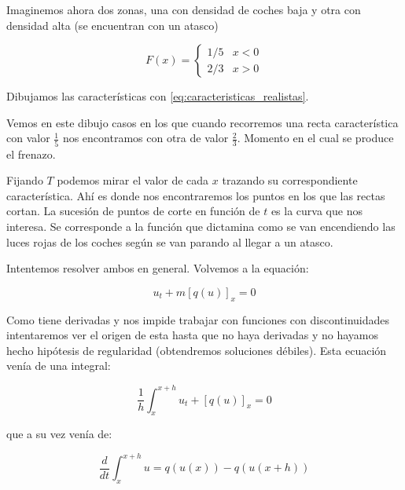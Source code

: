 		\begin{example}[Frenazo]

			Imaginemos ahora dos zonas, una con densidad de coches baja y otra con densidad alta (se encuentran con un atasco)

			\begin{figure}[!htb]
				\centering
				\caption{}
				\label{fig:modeloAtasco}
			\end{figure}

			$$F(x) =
			\begin{cases}
				1/5 & x < 0 \\
				2/3 & x > 0
			\end{cases}
			$$

			Dibujamos las características con \ref{eq:caracteristicas_realistas}.

			\begin{figure}[!htb]
				\centering
				\caption{}
				\label{fig:ondaChoque}
			\end{figure}

			Vemos en este dibujo casos en los que cuando recorremos una recta característica con valor $\frac{1}{5}$ nos encontramos con otra de valor $\frac{2}{3}$. Momento en el cual se produce el frenazo.

			Fijando $T$ podemos mirar el valor de cada $x$ trazando su correspondiente característica. Ahí es donde nos encontraremos los puntos en los que las rectas cortan. La sucesión de puntos de corte en función de $t$ es la curva que nos interesa. Se corresponde a la función que dictamina como se van encendiendo las luces rojas de los coches según se van parando al llegar a un atasco.

		\end{example}

		Intentemos resolver ambos en general. Volvemos a la equación:

		$$u_t +m [q(u)]_x = 0$$

		Como tiene derivadas y nos impide trabajar con funciones con discontinuidades intentaremos ver el origen de esta hasta que no haya derivadas y no hayamos hecho hipótesis de regularidad (obtendremos soluciones débiles). Esta ecuación venía de una integral:

		$$\frac{1}{h} \int^{x+h}_{x} u_t + [q(u)]_x = 0$$

		que a su vez venía de:

		$$\frac{d}{dt} \int^{x+h}_{x} u = q(u(x))-q(u(x+h))$$

